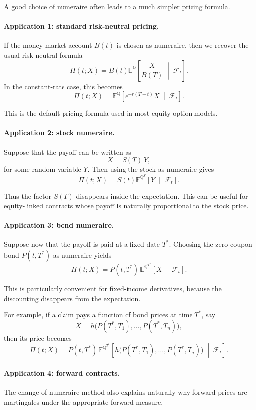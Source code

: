 \documentclass[11pt]{article}
\newcommand{\Qbb}{\mathbb{Q}}
\newcommand{\E}{\mathbb{E}}
\theoremstyle{definition}
\theoremstyle{plain}
\begin{document}
A good choice of numeraire often leads to a much simpler pricing
formula.

\paragraph{Application 1: standard risk-neutral pricing.}
If the money market account \(B(t)\) is chosen as numeraire, then we
recover the usual risk-neutral formula
\[
\Pi(t;X)
=
B(t)\E^\Qbb\!\left[
\frac{X}{B(T)}
\;\middle|\;
\mathcal{F}_t
\right].
\]
In the constant-rate case, this becomes
\[
\Pi(t;X)
=
\E^\Qbb\!\left[
e^{-r(T-t)}X
\;\middle|\;
\mathcal{F}_t
\right].
\]

This is the default pricing formula used in most equity-option models.

\paragraph{Application 2: stock numeraire.}
Suppose that the payoff can be written as
\[
X=S(T)\,Y,
\]
for some random variable \(Y\).
Then using the stock as numeraire gives
\[
\Pi(t;X)
=
S(t)\E^{\Qbb^S}\!\left[
Y
\;\middle|\;
\mathcal{F}_t
\right].
\]

Thus the factor \(S(T)\) disappears inside the expectation.
This can be useful for equity-linked contracts whose payoff is naturally
proportional to the stock price.

\paragraph{Application 3: bond numeraire.}
Suppose now that the payoff is paid at a fixed date \(T^\ast\).
Choosing the zero-coupon bond \(P(t,T^\ast)\) as numeraire yields
\[
\Pi(t;X)
=
P(t,T^\ast)\,
\E^{\Qbb^{T^\ast}}\!\left[
X
\;\middle|\;
\mathcal{F}_t
\right].
\]

This is particularly convenient for fixed-income derivatives, because
the discounting disappears from the expectation.

For example, if a claim pays a function of bond prices at time
\(T^\ast\), say
\[
X=h\big(P(T^\ast,T_1),\dots,P(T^\ast,T_n)\big),
\]
then its price becomes
\[
\Pi(t;X)
=
P(t,T^\ast)\,
\E^{\Qbb^{T^\ast}}\!\left[
h\big(P(T^\ast,T_1),\dots,P(T^\ast,T_n)\big)
\;\middle|\;
\mathcal{F}_t
\right].
\]

\paragraph{Application 4: forward contracts.}
The change-of-numeraire method also explains naturally why forward
prices are martingales under the appropriate forward measure.
\end{document}
